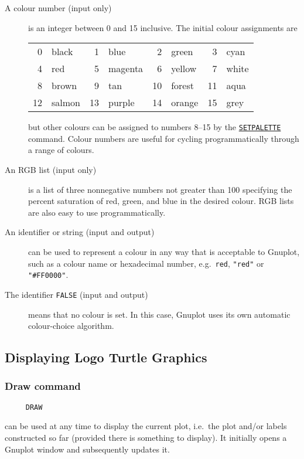 \begin{description}
\item[A colour number (input only)] is an integer between 0 and 15
  inclusive.  The initial colour assignments are
  \begin{center}
    \begin{tabular}{rlrlrlrl}
       0 & black  &  1 & blue    &  2 & green  &  3 & cyan  \\
       4 & red    &  5 & magenta &  6 & yellow &  7 & white \\
       8 & brown  &  9 & tan     & 10 & forest & 11 & aqua  \\
      12 & salmon & 13 & purple  & 14 & orange & 15 & grey
    \end{tabular}
  \end{center}
  but other colours can be assigned to numbers 8--15 by the
  \hyperlink{logoturtle:setpalette}{\texttt{SETPALETTE}} command.
  Colour numbers are useful for cycling programmatically through a
  range of colours.

\item[An RGB list (input only)] is a list of three nonnegative numbers
  not greater than 100 specifying the percent saturation of red,
  green, and blue in the desired colour.  RGB lists are also easy to
  use programmatically.

\item[An identifier or string (input and output)] can be used to
  represent a colour in any way that is acceptable to Gnuplot, such as
  a colour name or hexadecimal number, e.g.\ \texttt{red},
  \texttt{"red"} or \texttt{"\#FF0000"}.

\item[The identifier \texttt{FALSE} (input and output)] means that no
  colour is set.  In this case, Gnuplot uses its own automatic
  colour-choice algorithm.
\end{description}


\subsection{Displaying Logo Turtle Graphics}

\hypertarget{logoturtle:draw}{\subsubsection*{Draw command}}
\begin{verbatim}
     DRAW
\end{verbatim}
can be used at any time to display the current plot, i.e.\ the plot
and/or labels constructed so far (provided there is something to
display).  It initially opens a Gnuplot window and subsequently
updates it.


